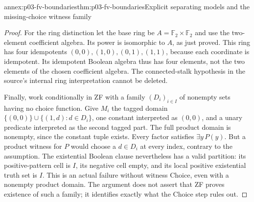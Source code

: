 \begin{annexitem}{annex:p03-fv-boundaries}{thm:p03-fv-boundaries}{Explicit separating models and the missing-choice witness family}
\begin{proof}
For the ring distinction let the base ring be
\(A=\mathbb F_2\times\mathbb F_2\) and use the two-element coefficient
algebra. Its power is isomorphic to \(A\), as just proved. This ring has
four idempotents \((0,0),(1,0),(0,1),(1,1)\), because each coordinate
is idempotent. Its idempotent Boolean algebra thus has four elements,
not the two elements of the chosen coefficient algebra. The connected-stalk
hypothesis in the source's internal ring interpretation cannot be deleted.

Finally, work conditionally in ZF with a family \((D_i)_{i\in I}\) of
nonempty sets having no choice function. Give \(M_i\) the tagged domain
\(\{(0,0)\}\cup\{(1,d):d\in D_i\}\), one constant interpreted as
\((0,0)\), and a unary predicate interpreted as the second tagged part.
The full product domain is nonempty, since the constant tuple exists.
Every factor satisfies \(\exists y\,P(y)\). But a product witness for
\(P\) would choose a \(d\in D_i\) at every index, contrary to the
assumption. The existential Boolean clause nevertheless has a valid
partition: its positive-pattern cell is \(I\), its negative cell empty,
and its local positive existential truth set is \(I\).
This is an actual failure without witness Choice, even with a nonempty
product domain. The argument does not assert that ZF proves existence of
such a family; it identifies exactly what the Choice step rules out.
\end{proof}
\end{annexitem}

